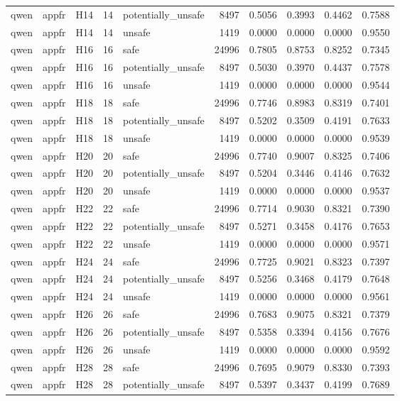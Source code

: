 \begin{table}[tbp]
\begin{tabular}{lllrlrrrrr}
qwen & appfr & H14 & 14 & potentially\_unsafe & 8497 & 0.5056 & 0.3993 & 0.4462 & 0.7588 \\
qwen & appfr & H14 & 14 & unsafe & 1419 & 0.0000 & 0.0000 & 0.0000 & 0.9550 \\
qwen & appfr & H16 & 16 & safe & 24996 & 0.7805 & 0.8753 & 0.8252 & 0.7345 \\
qwen & appfr & H16 & 16 & potentially\_unsafe & 8497 & 0.5030 & 0.3970 & 0.4437 & 0.7578 \\
qwen & appfr & H16 & 16 & unsafe & 1419 & 0.0000 & 0.0000 & 0.0000 & 0.9544 \\
qwen & appfr & H18 & 18 & safe & 24996 & 0.7746 & 0.8983 & 0.8319 & 0.7401 \\
qwen & appfr & H18 & 18 & potentially\_unsafe & 8497 & 0.5202 & 0.3509 & 0.4191 & 0.7633 \\
qwen & appfr & H18 & 18 & unsafe & 1419 & 0.0000 & 0.0000 & 0.0000 & 0.9539 \\
qwen & appfr & H20 & 20 & safe & 24996 & 0.7740 & 0.9007 & 0.8325 & 0.7406 \\
qwen & appfr & H20 & 20 & potentially\_unsafe & 8497 & 0.5204 & 0.3446 & 0.4146 & 0.7632 \\
qwen & appfr & H20 & 20 & unsafe & 1419 & 0.0000 & 0.0000 & 0.0000 & 0.9537 \\
qwen & appfr & H22 & 22 & safe & 24996 & 0.7714 & 0.9030 & 0.8321 & 0.7390 \\
qwen & appfr & H22 & 22 & potentially\_unsafe & 8497 & 0.5271 & 0.3458 & 0.4176 & 0.7653 \\
qwen & appfr & H22 & 22 & unsafe & 1419 & 0.0000 & 0.0000 & 0.0000 & 0.9571 \\
qwen & appfr & H24 & 24 & safe & 24996 & 0.7725 & 0.9021 & 0.8323 & 0.7397 \\
qwen & appfr & H24 & 24 & potentially\_unsafe & 8497 & 0.5256 & 0.3468 & 0.4179 & 0.7648 \\
qwen & appfr & H24 & 24 & unsafe & 1419 & 0.0000 & 0.0000 & 0.0000 & 0.9561 \\
qwen & appfr & H26 & 26 & safe & 24996 & 0.7683 & 0.9075 & 0.8321 & 0.7379 \\
qwen & appfr & H26 & 26 & potentially\_unsafe & 8497 & 0.5358 & 0.3394 & 0.4156 & 0.7676 \\
qwen & appfr & H26 & 26 & unsafe & 1419 & 0.0000 & 0.0000 & 0.0000 & 0.9592 \\
qwen & appfr & H28 & 28 & safe & 24996 & 0.7695 & 0.9079 & 0.8330 & 0.7393 \\
qwen & appfr & H28 & 28 & potentially\_unsafe & 8497 & 0.5397 & 0.3437 & 0.4199 & 0.7689 \\

\end{tabular}
\end{table}
